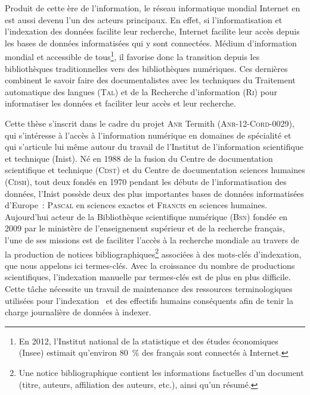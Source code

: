     Produit de cette ère de l'information, le réseau informatique mondial
    Internet en est aussi devenu l'un des acteurs principaux. En effet, si
    l'informatisation et l'indexation des données facilite leur recherche,
    Internet facilite leur accès depuis les bases de données informatisées qui y
    sont connectées. Médium d'information mondial et accessible de
    tous\footnote{En 2012, l'Institut national de la statistique et des études
    économiques (Insee) estimait qu'environ 80~\% des français sont connectés à
    Internet.}, il favorise donc la transition depuis les bibliothèques
    traditionnelles vers des bibliothèques numériques. Ces dernières combinent
    le savoir faire des documentalistes avec les techniques du Traitement
    automatique des langues (\textsc{Tal}) et de la Recherche d'information
    (\textsc{Ri}) pour informatiser les données et faciliter leur accès et leur
    recherche.

    Cette thèse s'inscrit dans le cadre du projet \textsc{Anr} Termith
    (\textsc{Anr-12-Cord-0029}), qui s'intéresse à l'accès à l'information
    numérique en domaines de spécialité et qui s'articule lui même autour du
    travail de l'Institut de l'information scientifique et technique (Inist). Né
    en 1988 de la fusion du Centre de documentation scientifique et technique
    (\textsc{Cdst}) et du Centre de documentation sciences humaines
    (\textsc{Cdsh}), tout deux fondés en 1970 pendant les débuts de
    l'informatisation des données, l'Inist possède deux des plus importantes
    bases de données informatisées d'Europe~: \textsc{Pascal} en sciences
    exactes et \textsc{Francis} en sciences humaines. Aujourd'hui acteur de la
    Bibliothèque scientifique numérique (\textsc{Bsn}) fondée en 2009 par le
    ministère de l'enseignement supérieur et de la recherche français, l'une de
    ses missions est de faciliter l'accès à la recherche mondiale au travers de
    la production de notices bibliographiques\footnote{Une notice
    bibliographique contient les informations factuelles d'un document (titre,
    auteurs, affiliation des auteurs, etc.), ainsi qu'un résumé.} associées à
    des mots-clés d'indexation, que nous appelons ici termes-clés. Avec la
    croissance du nombre de productions scientifiques, l'indexation manuelle par
    termes-clés est de plus en plus difficile. Cette tâche nécessite un travail
    de maintenance des ressources terminologiques utilisées pour
    l'indexation~\cite{guinchat1996techniquesdocumentaires} et
    des effectifs humains conséquents afin de tenir la charge journalière de
    données à indexer.

